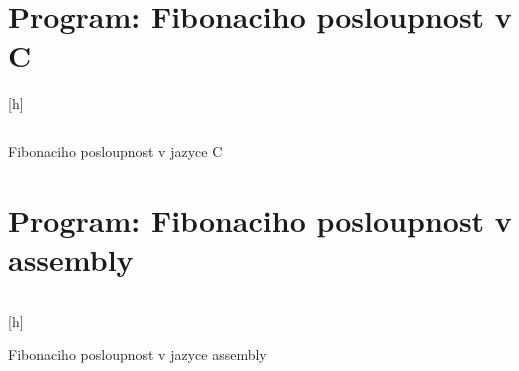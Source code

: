 \documentclass[FM,BP]{tulthesis}
\newenvironment{myquote}{\begin{list}{}{\setlength\leftmargin\parindent}\item[]}{\end{list}}
\newenvironment{listing}{\begin{myquote}\color{\tulcolor}}{\end{myquote}}
\begin{document}


\section{Program: Fibonaciho posloupnost v C}
\begin{listing}[h]
    \inputminted[linenos]{c}{assets/fibonaci.c}
    \caption{Fibonaciho posloupnost v jazyce C}
    \label{listing:fib_c}
\end{listing}
\newpage

\section{Program: Fibonaciho posloupnost v assembly}
\inputminted[linenos]{gas}{assets/fib_func.asm}
\begin{listing}[h]
    \caption{Fibonaciho posloupnost v jazyce assembly}
    \label{listing:fib_asm}
\end{listing}

\printbibliography[title={Použitá literatura}] %

\renewcommand{\indexname}{Rejstřík instrukcí a pojmů}
\printindex
\end{document}
